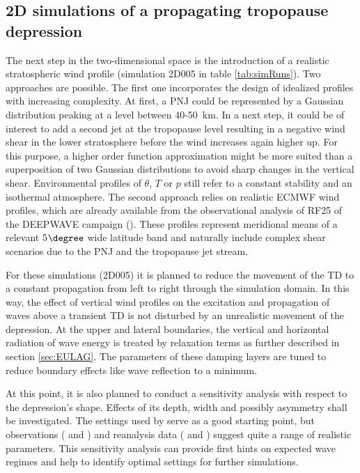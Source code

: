 \subsection{2D simulations of a propagating tropopause depression}
\label{sec:2D}

The next step in the two-dimensional space is the introduction of a realistic stratospheric wind profile (simulation 2D005 in table \ref{tab:simRuns}). Two approaches are possible. The first one incorporates the design of idealized profiles with increasing complexity. At first, a PNJ could be represented by a Gaussian distribution peaking at a level between 40-\SI{50}{\kilo\meter}. In a next step, it could be of interest to add a second jet at the tropopause level resulting in a negative wind shear in the lower stratosphere before the wind increases again higher up. For this purpose, a higher order function approximation might be more suited than a superposition of two Gaussian distributions to avoid sharp changes in the vertical shear. Environmental profiles of $\theta$, $T$ or $p$ still refer to a constant stability and an isothermal atmosphere. The second approach relies on realistic ECMWF wind profiles, which are already available from the observational analysis of RF25 of the DEEPWAVE campaign (\cite{dornbrack_stratospheric_2021}). These profiles represent meridional means of a relevant 5$\degree$ wide latitude band and naturally include complex shear scenarios due to the PNJ and the tropopause jet stream. 

For these simulations (2D005) it is planned to reduce the movement of the TD to a constant propagation from left to right through the simulation domain. In this way, the effect of vertical wind profiles on the excitation and propagation of waves above a transient TD is not disturbed by an unrealistic movement of the depression. At the upper and lateral boundaries, the vertical and horizontal radiation of wave energy is treated by relaxation terms as further described in section \ref{sec:EULAG}. The parameters of these damping layers are tuned to reduce boundary effects like wave reflection to a minimum.

At this point, it is also planned to conduct a sensitivity analysis with respect to the depression's shape. Effects of its depth, width and possibly asymmetry shall be investigated. The settings used by \textcite{prusa_all-scale_2003} serve as a good starting point, but observations (\cite{bush_tropopause_1994} and \cite{keyser_review_1986}) and reanalysis data (\cite{dornbrack_stratospheric_2021} and \cite{skerlak_tropopause_2015}) suggest quite a range of realistic parameters. This sensitivity analysis can provide first hints on expected wave regimes and help to identify optimal settings for further simulations.

